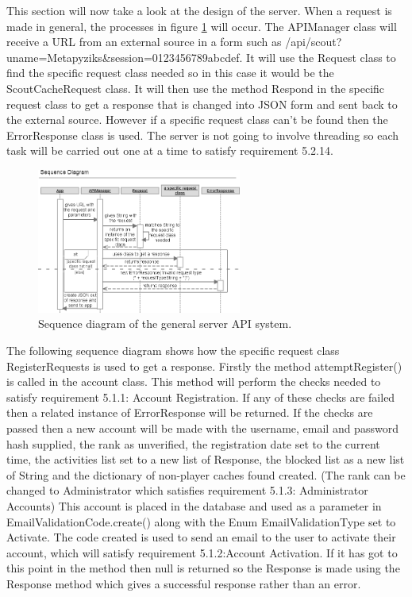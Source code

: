 This section will now take a look at the design of the server. When a request is made in general, the processes in figure \ref{fig:serverGeneral} will occur. The APIManager class will receive a URL from an external source in a form such as /api/scout?uname=Metapyziks\&session=0123456789abcdef. It will use the Request class to find the specific request class needed so in this case it would be the ScoutCacheRequest class. It will then use the method Respond in the specific request class to get a response that is changed into JSON form and sent back to the external source. However if a specific request class can't be found then the ErrorResponse class is used. The server is not going to involve threading so each task will be carried out one at a time to satisfy requirement 5.2.14.

\begin{figure}
    \includegraphics[width=0.6\textwidth]{images/sequence/Servergeneral}
    \caption{Sequence diagram of the general server API system.}
    \label{fig:serverGeneral}
\end{figure}
The following sequence diagram shows how the specific request class RegisterRequests is used to get a response. Firstly the method attemptRegister() is called in the account class. This method will perform the checks needed to satisfy requirement 5.1.1: Account Registration. If any of these checks are failed then a related instance of ErrorResponse will be returned. If the checks are passed then a new account will be made with the username, email and password hash supplied, the rank as unverified, the registration date set to the current time, the activities list set to a new list of Response, the blocked list as a new list of String and the dictionary of non-player caches found created. (The rank can be changed to Administrator which satisfies requirement 5.1.3: Administrator Accounts) This account is placed in the database and used as a parameter in EmailValidationCode.create() along with the Enum EmailValidationType set to Activate. The code created is used to send an email to the user to activate their account, which will satisfy requirement 5.1.2:Account Activation. If it has got to this point in the method then null is returned so the Response is made using the Response method which gives a successful response rather than an error.


